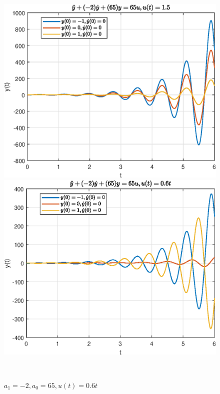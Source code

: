 \documentclass[a4paper]{article}
\begin{document}
\begin{figure}[H]
    \begin{minipage}{0.5\textwidth}
        \centering \includegraphics[width=\textwidth]{ex1/1.5_-2_65.eps}
        \caption{$a_1 = -2, a_0 = 65, u(t) = 1.5$}
    \end{minipage}\hfill
    \begin{minipage}{0.5\textwidth}
        \centering \includegraphics[width=\textwidth]{ex1/0.6t_-2_65.eps}
        \caption{$a_1 = -2, a_0 = 65, u(t) = 0.6t$}
    \end{minipage}\\[1em]
\end{figure}\noindent\
\end{document}
